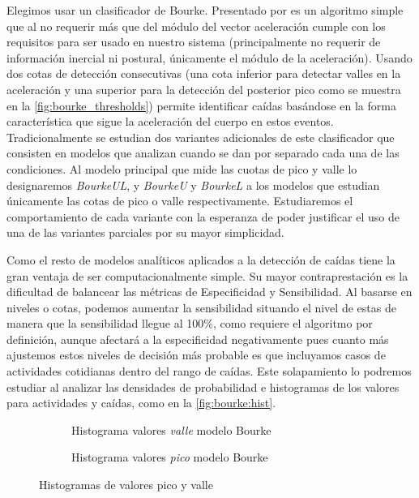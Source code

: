 Elegimos usar un clasificador de Bourke. Presentado por  es un algoritmo simple que al no requerir más que del módulo del vector aceleración cumple con los requisitos para ser usado en nuestro sistema (principalmente no requerir de información inercial ni postural, únicamente el módulo de la aceleración). Usando dos cotas de detección consecutivas (una cota inferior para detectar valles en la aceleración y una superior para la detección del posterior pico como se muestra en la \autoref{fig:bourke_thresholds}) permite identificar caídas basándose en la forma característica que sigue la aceleración del cuerpo en estos eventos. Tradicionalmente se estudian dos variantes adicionales de este clasificador que consisten en modelos que analizan cuando se dan por separado cada una de las condiciones. Al modelo principal que mide las cuotas de pico y valle lo designaremos \textit{BourkeUL}, y \textit{BourkeU} y \textit{BourkeL} a los modelos que estudian únicamente las cotas de pico o valle respectivamente. Estudiaremos el comportamiento de cada variante con la esperanza de poder justificar el uso de una de las variantes parciales por su mayor simplicidad.

Como el resto de modelos analíticos aplicados a la detección de caídas tiene la gran ventaja de ser computacionalmente simple. Su mayor contraprestación es la dificultad de balancear las métricas de Especificidad y Sensibilidad. Al basarse en niveles o cotas, podemos aumentar la sensibilidad situando el nivel de estas de manera que la sensibilidad llegue al 100\%, como requiere el algoritmo por definición, aunque afectará a la especificidad negativamente \cite{Aziz2017} pues cuanto más ajustemos estos niveles de decisión más probable es que incluyamos casos de actividades cotidianas dentro del rango de caídas. Este solapamiento lo podremos estudiar al analizar las densidades de probabilidad e histogramas de los valores para actividades y caídas, como en la \autoref{fig:bourke:hist}.

\begin{figure}[htb!]
  \centering
  \begin{subfigure}[b]{0.48\textwidth}
      \centering
      \caption{\footnotesize Histograma valores \textit{valle} modelo Bourke}
      \label{fig:bourke:hist:low}
  \end{subfigure}
  \hfill
  \begin{subfigure}[b]{0.48\textwidth}
      \centering
      \caption{\footnotesize Histograma valores \textit{pico} modelo Bourke}
      \label{fig:bourke:hist:high}
  \end{subfigure}
  \caption{\label{fig:bourke:hist} Histogramas de valores pico y valle}
\end{figure}

